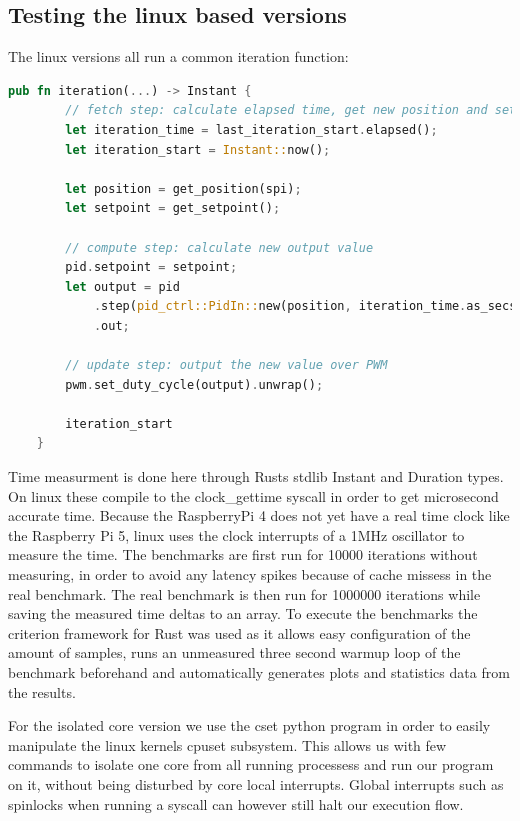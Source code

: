 \subsection{Testing the linux based versions}
The linux versions all run a common iteration function:
\begin{lstlisting}[language=Rust,style=colouredRust]
    pub fn iteration(...) -> Instant {
        // fetch step: calculate elapsed time, get new position and setpoint
        let iteration_time = last_iteration_start.elapsed();
        let iteration_start = Instant::now();
    
        let position = get_position(spi);
        let setpoint = get_setpoint();
    
        // compute step: calculate new output value
        pid.setpoint = setpoint;
        let output = pid
            .step(pid_ctrl::PidIn::new(position, iteration_time.as_secs_f64()))
            .out;
    
        // update step: output the new value over PWM
        pwm.set_duty_cycle(output).unwrap();
    
        iteration_start
    }
\end{lstlisting}

Time measurment is done here through Rusts stdlib Instant and Duration types.
On linux these compile to the clock\_gettime syscall in order to get microsecond accurate time.
Because the RaspberryPi 4 does not yet have a real time clock like the Raspberry Pi 5,
linux uses the clock interrupts of a 1MHz oscillator to measure the time.
The benchmarks are first run for 10000 iterations without measuring, in order to avoid any latency spikes because of cache missess in the real benchmark.
The real benchmark is then run for 1000000 iterations while saving the measured time deltas to an array.
To execute the benchmarks the criterion framework for Rust was used as it allows easy configuration of the amount of samples,
runs an unmeasured three second warmup loop of the benchmark beforehand and automatically generates plots and statistics data from the results.

For the isolated core version we use the cset python program in order to easily manipulate the linux kernels cpuset subsystem.
This allows us with few commands to isolate one core from all running processess and run our program on it, without being disturbed by core local interrupts.
Global interrupts such as spinlocks when running a syscall can however still halt our execution flow.

